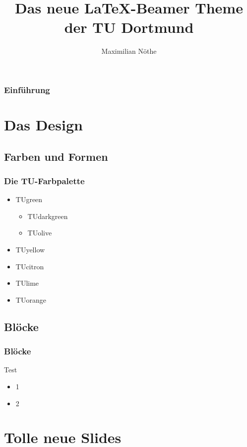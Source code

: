 \documentclass{beamer}
\title{Das neue \LaTeX-Beamer Theme der TU Dortmund}
\author{Maximilian Nöthe}
\institute[Lehrstuhl E5b \\ Fakultät Physik]{Lehrstuhl E5b \par\vspace{3pt} Fakultät Physik}
\begin{document}
\begin{frame}
\setcounter{framenumber}{0}
    \titlepage
\end{frame}

\begin{frame}
    \frametitle{Einführung}
    \tableofcontents[pausesections]
\end{frame}

\section{Das Design}
\subsection{Farben und Formen}
\begin{frame}
    \frametitle{Die TU-Farbpalette}
    \begin{itemize}
        \item \textcolor{TUgreen}{TUgreen}
            \begin{itemize}
                \item \textcolor{TUdarkgreen}{TUdarkgreen}
                \item \textcolor{TUolive}{TUolive}
            \end{itemize}
        \item \textcolor{TUyellow}{TUyellow}
        \item \textcolor{TUcitron}{TUcitron}
        \item \textcolor{TUlime}{TUlime}
        \item \textcolor{TUorange}{TUorange}
    \end{itemize}
\end{frame}

\subsection{Blöcke}
\begin{frame}
    \frametitle{Blöcke}
    \begin{block}{Test}
        \begin{itemize}
            \item 1
            \item 2
        \end{itemize}
    \end{block}
\end{frame}

\section{Tolle neue Slides}
\end{document}
